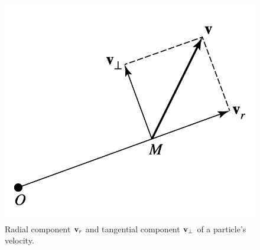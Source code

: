\begin{figure}[h]
	\begin{center}
		\includegraphics[scale=0.6]{fig/fig1-A-cohen.png}
		\caption{Radial component $\vb{v}_r$ and tangential component $\vb{v}_\perp$ of a particle's velocity.}
		\label{fig:1-a-cohen}
	\end{center}	
\end{figure}

